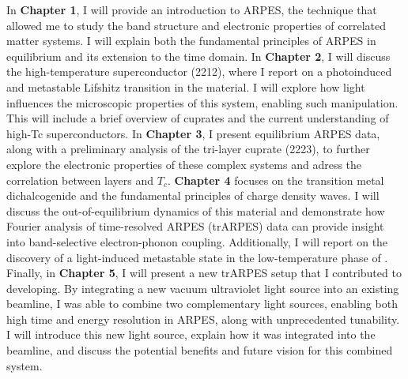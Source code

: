 In \textbf{Chapter 1}, I will provide an introduction to ARPES, the technique that allowed me to study the band structure and electronic properties of correlated matter systems.
I will explain both the fundamental principles of ARPES in equilibrium and its extension to the time domain.
In \textbf{Chapter 2}, I will discuss the high-temperature superconductor  (2212), where I report on a photoinduced and metastable Lifshitz transition in the material.
I will explore how light influences the microscopic properties of this system, enabling such manipulation.
This will include a brief overview of cuprates and the current understanding of high-Tc superconductors.
In \textbf{Chapter 3}, I present equilibrium ARPES data, along with a preliminary analysis of the tri-layer cuprate  (2223), to further explore the electronic properties of these complex systems and adress the correlation between  layers and $T_c$.
\textbf{Chapter 4} focuses on the transition metal dichalcogenide  and the fundamental principles of charge density waves.
I will discuss the out-of-equilibrium dynamics of this material and demonstrate how Fourier analysis of time-resolved ARPES (trARPES) data can provide insight into band-selective electron-phonon coupling.
Additionally, I will report on the discovery of a light-induced metastable state in the low-temperature phase of .
Finally, in \textbf{Chapter 5}, I will present a new trARPES setup that I contributed to developing.
By integrating a new vacuum ultraviolet light source into an existing beamline, I was able to combine two complementary light sources, enabling both high time and energy resolution in ARPES, along with unprecedented tunability.
I will introduce this new light source, explain how it was integrated into the beamline, and discuss the potential benefits and future vision for this combined system.